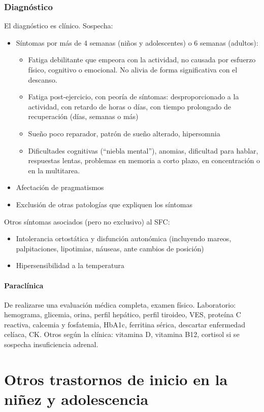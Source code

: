 \documentclass{scrbook}
\begin{document}
\subsection*{Diagnóstico}
El diagnóstico es clínico.
Sospecha:
\begin{itemize}
	\item Síntomas por más de 4 semanas (niños y adolescentes) o 6 semanas (adultos):
	\begin{itemize}
		\item Fatiga debilitante que empeora con la actividad, no causada por esfuerzo físico, cognitivo o emocional. No alivia de forma significativa con el descanso.
		\item Fatiga post-ejercicio, con peoría de síntomas: desproporcionado a la actividad, con retardo de horas o días, con tiempo prolongado de recuperación (días, semanas o más)
		\item Sueño poco reparador, patrón de sueño alterado, hipersomnia
		\item Dificultades cognitivas (``niebla mental''), anomias, dificultad para hablar, respuestas lentas, problemas en memoria a corto plazo, en concentración o en la multitarea.
	\end{itemize}
	\item Afectación de pragmatismos
	\item Exclusión de otras patologías que expliquen los síntomas
\end{itemize}
Otros síntomas asociados (pero no exclusivo) al SFC:
\begin{itemize}
	\item Intolerancia ortostática y disfunción autonómica (incluyendo mareos, palpitaciones, lipotimias, náuseas, ante cambios de posición)
	\item Hipersensibilidad a la temperatura
\end{itemize}
\subsubsection*{Paraclínica}
De realizarse una evaluación médica completa, examen físico.
Laboratorio: hemograma, glicemia, orina, perfil hepático, perfil tiroideo, VES, proteína C reactiva, calcemia y fosfatemia, HbA1c, ferritina sérica, descartar enfermedad celíaca, CK.
Otros según la clínica: vitamina D, vitamina B12, cortisol si se sospecha insuficiencia adrenal.

\printbibliography

\chapter{Otros trastornos de inicio en la niñez y adolescencia}
\end{document}

